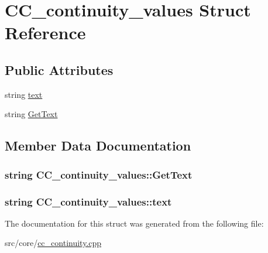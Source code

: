 \hypertarget{a00028}{\section{C\-C\-\_\-continuity\-\_\-values Struct Reference}
\label{a00028}
}
\subsection*{Public Attributes}
\begin{DoxyCompactItemize}
\item 
string \hyperlink{a00028_ac2607e51859f3ceb24f7fd49d0fe2516}{text}
\item 
string \hyperlink{a00028_a51f4e7859eb92c164044d35642139210}{Get\-Text}
\end{DoxyCompactItemize}


\subsection{Member Data Documentation}
\hypertarget{a00028_a51f4e7859eb92c164044d35642139210}{
\subsubsection[{Get\-Text}]{\setlength{\rightskip}{0pt plus 5cm}string C\-C\-\_\-continuity\-\_\-values\-::\-Get\-Text}}\label{a00028_a51f4e7859eb92c164044d35642139210}
\hypertarget{a00028_ac2607e51859f3ceb24f7fd49d0fe2516}{
\subsubsection[{text}]{\setlength{\rightskip}{0pt plus 5cm}string C\-C\-\_\-continuity\-\_\-values\-::text}}\label{a00028_ac2607e51859f3ceb24f7fd49d0fe2516}


The documentation for this struct was generated from the following file\-:\begin{DoxyCompactItemize}
\item 
src/core/\hyperlink{a00201}{cc\-\_\-continuity.\-cpp}\end{DoxyCompactItemize}
